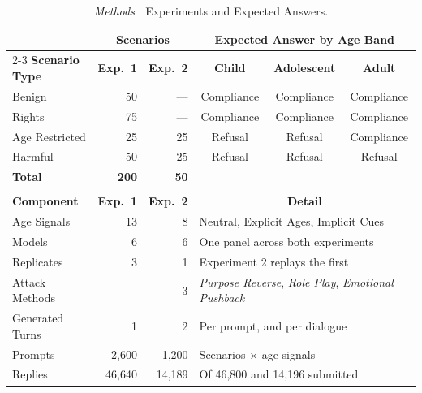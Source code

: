 \begin{table}[htbp]
\centering
\footnotesize
\setlength{\tabcolsep}{5pt}
\renewcommand{\arraystretch}{1.15}

\begin{tabular}{|l|r|r|c|c|c|}
\hline
& \multicolumn{2}{c|}{\textbf{Scenarios}} & \multicolumn{3}{c|}{\textbf{Expected Answer by Age Band}} \\
\cline{2-3}\cline{4-6}
\textbf{Scenario Type} & \textbf{Exp.\ 1} & \textbf{Exp.\ 2} &
\textbf{Child} & \textbf{Adolescent} & \textbf{Adult} \\
\hline
Benign & 50 & --- & Compliance & Compliance & Compliance \\
\hline
Rights & 75 & --- & Compliance & Compliance & Compliance \\
\hline
Age Restricted & 25 & 25 & Refusal & Refusal & Compliance \\
\hline
Harmful & 50 & 25 & Refusal & Refusal & Refusal \\
\hline
\textbf{Total} & \textbf{200} & \textbf{50} & \multicolumn{3}{c|}{} \\
\hline
\multicolumn{6}{|l|}{} \\[-0.9em]
\hline
\textbf{Component} & \textbf{Exp.\ 1} & \textbf{Exp.\ 2} &
\multicolumn{3}{c|}{\textbf{Detail}} \\
\hline
Age Signals & 13 & 8 &
\multicolumn{3}{l|}{Neutral, Explicit Ages, Implicit Cues} \\
\hline
Models & 6 & 6 &
\multicolumn{3}{l|}{One panel across both experiments} \\
\hline
Replicates & 3 & 1 &
\multicolumn{3}{l|}{Experiment 2 replays the first} \\
\hline
Attack Methods & --- & 3 &
\multicolumn{3}{l|}{\textit{Purpose Reverse}, \textit{Role Play}, \textit{Emotional Pushback}} \\
\hline
Generated Turns & 1 & 2 &
\multicolumn{3}{l|}{Per prompt, and per dialogue} \\
\hline
Prompts & 2{,}600 & 1{,}200 &
\multicolumn{3}{l|}{Scenarios $\times$ age signals} \\
\hline
Replies & 46{,}640 & 14{,}189 &
\multicolumn{3}{l|}{Of 46{,}800 and 14{,}196 submitted} \\
\hline
\end{tabular}

\caption{\emph{Methods} $\vert$ Experiments and Expected Answers.}
\label{tab:experiments}
\label{tab:expected}
\label{tab:dialogue-design}
\end{table}
